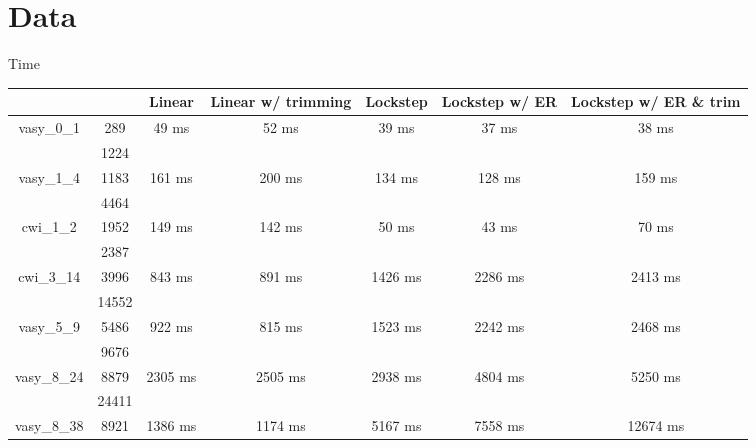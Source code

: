 \documentclass[../master/master.tex]{subfiles}
\begin{document}
\section{Data}
Time
\begin{center}
\begin{tabular}{ |c|c||c||c||c||c||c|| } 
\hline
 \multicolumn{2}{|c||}{} & Linear & Linear w/ trimming & Lockstep & Lockstep w/ ER & Lockstep w/ ER \& trim \\
\hline
\multirow{2}{3.8em}{vasy\_0\_1} & 289 & \multirow{2}{3.8em}{49 ms} & \multirow{2}{3.8em}{52 ms} & \multirow{2}{3.8em}{39 ms} & \multirow{2}{3.8em}{37 ms} & \multirow{2}{3.8em}{38 ms} \\
\cline{2-2}
 & 1224  & & & & & \\
\hline
\multirow{2}{3.8em}{vasy\_1\_4} & 1183 & \multirow{2}{3.8em}{161 ms} & \multirow{2}{3.8em}{200 ms} & \multirow{2}{3.8em}{134 ms} & \multirow{2}{3.8em}{128 ms} & \multirow{2}{3.8em}{159 ms} \\
\cline{2-2}
 & 4464  & & & & & \\
\hline
\multirow{2}{3.8em}{cwi\_1\_2} & 1952 & \multirow{2}{3.8em}{149 ms} & \multirow{2}{3.8em}{142 ms} & \multirow{2}{3.8em}{50 ms} & \multirow{2}{3.8em}{43 ms} & \multirow{2}{3.8em}{70 ms} \\
\cline{2-2}
 & 2387  & & & & & \\
\hline
\multirow{2}{3.8em}{cwi\_3\_14} & 3996 & \multirow{2}{3.8em}{843 ms} & \multirow{2}{3.8em}{891 ms} & \multirow{2}{3.8em}{1426 ms} & \multirow{2}{3.8em}{2286 ms} & \multirow{2}{3.8em}{2413 ms} \\
\cline{2-2}
 & 14552  & & & & & \\
\hline
\multirow{2}{3.8em}{vasy\_5\_9} & 5486 & \multirow{2}{3.8em}{922 ms} & \multirow{2}{3.8em}{815 ms} & \multirow{2}{3.8em}{1523 ms} & \multirow{2}{3.8em}{2242 ms} & \multirow{2}{3.8em}{2468 ms} \\
\cline{2-2}
 & 9676  & & & & & \\
\hline
\multirow{2}{3.8em}{vasy\_8\_24} & 8879 & \multirow{2}{3.8em}{2305 ms} & \multirow{2}{3.8em}{2505 ms} & \multirow{2}{3.8em}{2938 ms} & \multirow{2}{3.8em}{4804 ms} & \multirow{2}{3.8em}{5250 ms} \\
\cline{2-2}
 & 24411  & & & & & \\
\hline
\multirow{2}{3.8em}{vasy\_8\_38} & 8921 & \multirow{2}{3.8em}{1386 ms} & \multirow{2}{3.8em}{1174 ms} & \multirow{2}{3.8em}{5167 ms} & \multirow{2}{3.8em}{7558 ms} & \multirow{2}{3.8em}{12674 ms} \\

\end{tabular}
\end{center}
\end{document}

